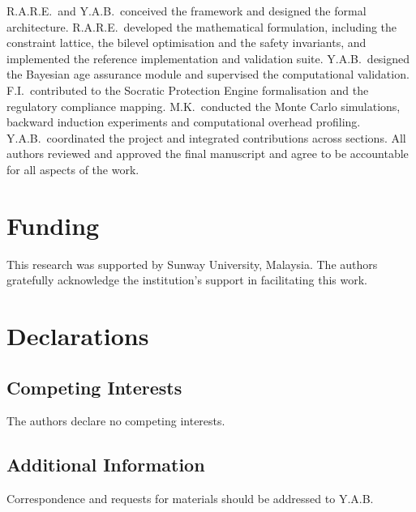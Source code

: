 \documentclass[fleqn,10pt]{wlscirep}
\begin{document}
R.A.R.E.\ and Y.A.B.\ conceived the framework and designed the formal architecture. R.A.R.E.\ developed the mathematical formulation, including the constraint lattice, the bilevel optimisation and the safety invariants, and implemented the reference implementation and validation suite. Y.A.B.\ designed the Bayesian age assurance module and supervised the computational validation. F.I.\ contributed to the Socratic Protection Engine formalisation and the regulatory compliance mapping. M.K.\ conducted the Monte Carlo simulations, backward induction experiments and computational overhead profiling. Y.A.B.\ coordinated the project and integrated contributions across sections. All authors reviewed and approved the final manuscript and agree to be accountable for all aspects of the work.

\section*{Funding}

This research was supported by Sunway University, Malaysia. The authors gratefully acknowledge the institution's support in facilitating this work.

\section*{Declarations}

\subsection*{Competing Interests}

The authors declare no competing interests.

\subsection*{Additional Information}

Correspondence and requests for materials should be addressed to Y.A.B.
\end{document}
